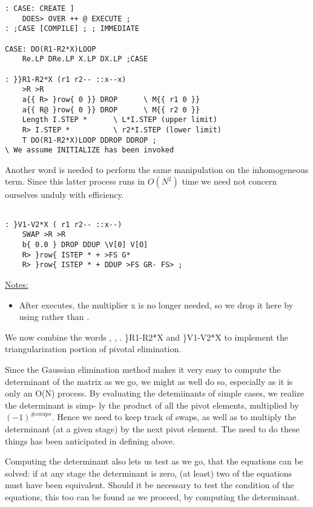 \begin{verbatim}
: CASE: CREATE ]
    DOES> OVER ++ @ EXECUTE ;
: ;CASE [COMPILE] ; ; IMMEDIATE

CASE: DO(R1-R2*X)LOOP
    Re.LP DRe.LP X.LP DX.LP ;CASE

: }}R1-R2*X (r1 r2-- ::x--x)
    >R >R
    a{{ R> }row{ 0 }} DROP      \ M{{ r1 0 }} 
    a{{ R@ }row{ 0 }} DROP      \ M{{ r2 0 }} 
    Length I.STEP *      \ L*I.STEP (upper limit)
    R> I.STEP *          \ r2*I.STEP (lower limit)
    T DO(R1-R2*X)LOOP DDROP DDROP ;
\ We assume INITIALIZE has been invoked
\end{verbatim} 
Another word is needed to perform the same manipulation on
the inhomogeneous term. Since this latter process runs in $O(N^2)$
time we need not concern ourselves unduly with efficiency.
\begin{verbatim}

: }V1-V2*X ( r1 r2-- ::x--)
    SWAP >R >R
    b{ 0.0 } DROP DDUP \V[0] V[O]
    R> }row{ ISTEP * + >FS G*
    R> }row{ ISTEP * + DDUP >FS GR- FS> ;
\end{verbatim} 
\underline{Notes:}

\begin{itemize}
    \item  After  executes, the multiplier x is no longer needed,
        so we drop it here by using  rather than .
\end{itemize}

We now combine the words , , .
\}R1-R2*X and \}V1-V2*X to implement the triangularization portion of pivotal elimination.

Since the Gaussian elimination method makes it very easy to
compute the determinant of the matrix as we go, we might as well
do so, especially as it is only an O(N) process. By evaluating the
detemiinants of simple cases, we realize the determinant is simp-
ly the product of all the pivot elements, multiplied by
$(-1)^{\#swaps}$. Hence we need to keep track of swaps, as well as to
multiply the determinant (at a given stage) by the next pivot
element. The need to do these things has been anticipated in
defining  above.

Computing the determinant also lets us test as we go, that the
equations can be solved: if at any stage the determinant is zero,
(at least) two of the equations must have been equivalent. Should
it be necessary to test the condition of the equations, this too
can be found as we proceed, by computing the determinant.

